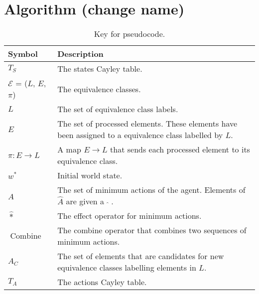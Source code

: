 \chapter{Algorithm (change name)}
\begin{table}[H]
	\centering
	\begin{tabularx}{\textwidth}{@{}lX@{}}
		\toprule
		\textbf{Symbol}                         & \textbf{Description}                                                                                     \\
		\midrule
		$T_{S}$                                 & The states Cayley table.                                                                                 \\
		$\mathcal{E}$ = ($L$, \; $E$, \; $\pi$) & The equivalence classes.                                                                                 \\
		$L$                                     & The set of equivalence class labels.                                                                     \\
		$E$                                     & The set of processed elements. These elements have been assigned to a equivalence class labelled by $L$. \\
		$\pi: E \to L$                          & A map $E \to L$ that sends each processed element to its equivalence class.                              \\
		$w^{*}$                                 & Initial world state.                                                                                     \\
		$\hat{A}$                               & The set of minimum actions of the agent. Elements of $\hat{A}$ are given a $\; \hat{ } \;$.              \\
		$\hat{*}$                               & The effect operator for minimum actions.                                                                 \\
		$\operatorname{Combine}$                & The combine operator that combines two sequences of minimum actions.                                     \\
		$A_{C}$                                 & The set of elements that are candidates for new equivalence classes labelling elements in $L$.           \\
		$T_{A}$                                 & The actions Cayley table.                                                                                \\
		\bottomrule
	\end{tabularx}
	\caption{Key for pseudocode.}
	\label{tab:pseudocode_key}
\end{table}



